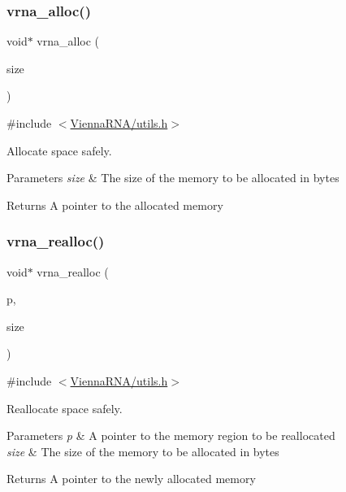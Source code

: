 \subsubsection{\texorpdfstring{vrna\+\_\+alloc()}{vrna\_alloc()}}
{\footnotesize\ttfamily void$\ast$ vrna\+\_\+alloc (\begin{DoxyParamCaption}\item[{unsigned}]{size }\end{DoxyParamCaption})}



{\ttfamily \#include $<$\mbox{\hyperlink{utils_8h}{Vienna\+R\+N\+A/utils.\+h}}$>$}



Allocate space safely. 


\begin{DoxyParams}{Parameters}
{\em size} & The size of the memory to be allocated in bytes \\
\hline
\end{DoxyParams}
\begin{DoxyReturn}{Returns}
A pointer to the allocated memory 
\end{DoxyReturn}
\mbox{\label{group__utils_ga27f4719a66c6f90d1cca3d1e6e696c6a}} 
\subsubsection{\texorpdfstring{vrna\+\_\+realloc()}{vrna\_realloc()}}
{\footnotesize\ttfamily void$\ast$ vrna\+\_\+realloc (\begin{DoxyParamCaption}\item[{void $\ast$}]{p,  }\item[{unsigned}]{size }\end{DoxyParamCaption})}



{\ttfamily \#include $<$\mbox{\hyperlink{utils_8h}{Vienna\+R\+N\+A/utils.\+h}}$>$}



Reallocate space safely. 


\begin{DoxyParams}{Parameters}
{\em p} & A pointer to the memory region to be reallocated \\
\hline
{\em size} & The size of the memory to be allocated in bytes \\
\hline
\end{DoxyParams}
\begin{DoxyReturn}{Returns}
A pointer to the newly allocated memory 
\end{DoxyReturn}
\mbox{\label{group__utils_ga36b35be01d7f36cf7f59c245eee628d1}} 
